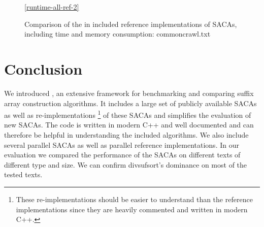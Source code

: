 \begin{figure}[!h]
    \medskip
    \ref{runtime-all-ref-2}
    \caption{Comparison of the in \sacabench included reference implementations of SACAs, including time and memory consumption: commoncrawl.txt}
\end{figure}
\FloatBarrier

\section{Conclusion}

We introduced \sacabench, an extensive framework for benchmarking and comparing suffix array construction algorithms.
It includes a large set of publicly available SACAs as well as re-implementations%
\footnote{These re-implementations should be easier to understand than the reference implementations since they are heavily commented and written in modern C++.}
of these SACAs and simplifies the evaluation of new SACAs.
The code is written in modern C++ and well documented and can therefore be helpful in understanding the included algorithms.
We also include several parallel SACAs as well as parallel reference implementations.
In our evaluation we compared the performance of the SACAs on different texts of different type and size.
We can confirm divsufsort's dominance on most of the tested texts.

